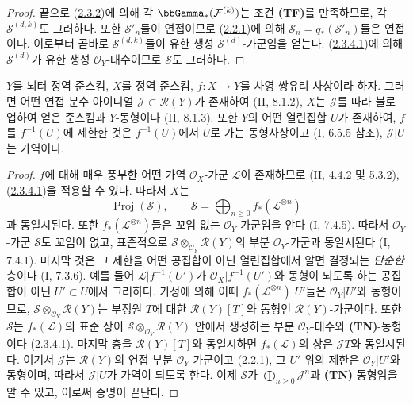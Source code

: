 \begin{proof}
끝으로 (\hyperref[III.2.3.2-fr]{2.3.2})에 의해 각
$\bbGamma_*(\mathcal F^{(k)})$는 조건 \textbf{(TF)}를 만족하므로,
각 $\mathcal S^{(d,k)}$도 그러하다. 또한 $\mathcal S'_n$들이
연접이므로 (\hyperref[III.2.2.1-fr]{2.2.1})에 의해
$\mathcal S_n=q_*(\mathcal S'_n)$들은 연접이다. 이로부터 곧바로
$\mathcal S^{(d,k)}$들이 유한 생성 $\mathcal S^{(d)}$-가군임을
얻는다. (\hyperref[III.2.3.4.1-fr]{2.3.4.1})에 의해
$\mathcal S^{(d)}$가 유한 생성 $\mathcal O_Y$-대수이므로
$\mathcal S$도 그러하다.
\end{proof}

\begin{proposition}[2.3.5]
\label{III.2.3.5-fr}
$Y$를 뇌터 정역 준스킴, $X$를 정역 준스킴,
$f:X\to Y$를 사영 쌍유리 사상이라 하자. 그러면 어떤 연접 분수
아이디얼 $\mathcal J\subset\mathcal R(Y)$가 존재하여 (II, 8.1.2),
$X$는 $\mathcal J$를 따라 블로업하여 얻은 준스킴과 $Y$-동형이다
(II, 8.1.3). 또한 $Y$의 어떤 열린집합 $U$가 존재하여, $f$를
$f^{-1}(U)$에 제한한 것은 $f^{-1}(U)$에서 $U$로 가는 동형사상이고
(I, 6.5.5 참조), $\mathcal J|U$는 가역이다.
\end{proposition}

\begin{proof}
$f$에 대해 매우 풍부한 어떤 가역 $\mathcal O_X$-가군 $\mathcal L$이
존재하므로 (II, 4.4.2 및 5.3.2),
(\hyperref[III.2.3.4.1-fr]{2.3.4.1})을 적용할 수 있다. 따라서 $X$는
\[
\operatorname{Proj}(\mathcal S),\qquad
\mathcal S=\bigoplus_{n\geq0}f_*(\mathcal L^{\otimes n})
\]
과 동일시된다. 또한 $f_*(\mathcal L^{\otimes n})$들은 꼬임 없는
$\mathcal O_Y$-가군임을 안다 (I, 7.4.5). 따라서
$\mathcal O_Y$-가군 $\mathcal S$도 꼬임이 없고, 표준적으로
$\mathcal S\otimes_{\mathcal O_Y}\mathcal R(Y)$의 부분
$\mathcal O_Y$-가군과 동일시된다 (I, 7.4.1). 마지막 것은 그 제한을
어떤 공집합이 아닌 열린집합에서 알면 결정되는 \emph{단순한} 층이다
(I, 7.3.6). 예를 들어 $\mathcal L|f^{-1}(U')$가
$\mathcal O_X|f^{-1}(U')$와 동형이 되도록 하는 공집합이 아닌
$U'\subset U$에서 그러하다. 가정에 의해 이때
$f_*(\mathcal L^{\otimes n})|U'$들은 $\mathcal O_Y|U'$와 동형이므로,
$\mathcal S\otimes_{\mathcal O_Y}\mathcal R(Y)$는 부정원 $T$에 대한
$\mathcal R(Y)[T]$와 동형인 $\mathcal R(Y)$-가군이다. 또한
$\mathcal S$는 $f_*(\mathcal L)$의 표준 상이
$\mathcal S\otimes_{\mathcal O_Y}\mathcal R(Y)$ 안에서 생성하는
부분 $\mathcal O_Y$-대수와 \textbf{(TN)}-동형이다
(\hyperref[III.2.3.4.1-fr]{2.3.4.1}). 마지막 층을
$\mathcal R(Y)[T]$와 동일시하면 $f_*(\mathcal L)$의 상은
$\mathcal J T$와 동일시된다. 여기서 $\mathcal J$는
$\mathcal R(Y)$의 연접 부분 $\mathcal O_Y$-가군이고
(\hyperref[III.2.2.1-fr]{2.2.1}), 그 $U'$ 위의 제한은
$\mathcal O_Y|U'$와 동형이며, 따라서 $\mathcal J|U$가 가역이 되도록
한다. 이제 $\mathcal S$가 $\bigoplus_{n\geq0}\mathcal J^n$과
\textbf{(TN)}-동형임을 알 수 있고, 이로써 증명이 끝난다.
\end{proof}

